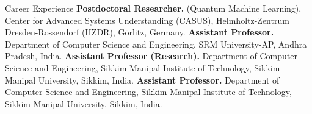 \begin{rubric}{Career Experience}
%
%
%
	\textbf{Postdoctoral Researcher.} (Quantum Machine Learning), Center for Advanced Systems Understanding (CASUS), Helmholtz-Zentrum Dresden-Rossendorf (HZDR), Görlitz, Germany.
%
	\textbf{Assistant Professor.} Department of Computer Science and Engineering, SRM University-AP, Andhra Pradesh, India.
%
	\textbf{Assistant Professor (Research).} Department of Computer Science and Engineering, Sikkim Manipal Institute of Technology, Sikkim Manipal University, Sikkim, India.
%
	\textbf{Assistant Professor.} Department of Computer Science and Engineering, Sikkim Manipal Institute of Technology, Sikkim Manipal University, Sikkim, India.
%
\end{rubric}